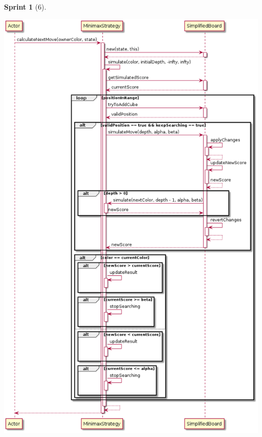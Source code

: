\documentclass{article}
\theoremstyle{break}
\newtheorem*{sprint}{Sprint}
\begin{document}
\begin{sprint}[6]
\begin{center}
\centering
\includegraphics[scale=0.5]{Minimax.calculateNextMove()-Sprint6.png}
\end{center}

\end{sprint}
\end{document}

